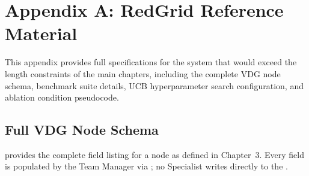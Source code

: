 \chapter{Appendix A: RedGrid Reference Material}
\label{AppendixA}

This appendix provides full specifications for the \redgrid{} system that would exceed the length constraints of the main chapters, including the complete VDG node schema, benchmark suite details, UCB hyperparameter search configuration, and ablation condition pseudocode.

\section{Full VDG Node Schema}
\label{app:vdg-schema}

 provides the complete field listing for a \vdg{} node as defined in Chapter~3. Every field is populated by the Team Manager via ; no Specialist writes directly to the \vdg{}.

